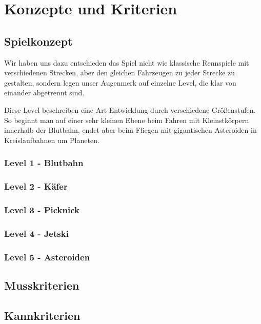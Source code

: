\section{Konzepte und Kriterien}

\subsection{Spielkonzept}

Wir haben uns dazu entschieden das Spiel nicht wie klassische Rennspiele mit verschiedenen Strecken, aber den gleichen Fahrzeugen zu jeder Strecke zu gestalten, sondern legen unser Augenmerk auf einzelne Level, die klar von einander abgetrennt sind.

Diese Level beschreiben eine Art Entwicklung durch verschiedene Größenstufen.
So beginnt man auf einer sehr kleinen Ebene beim Fahren mit Kleinstkörpern innerhalb der Blutbahn, endet aber beim Fliegen mit gigantischen Asteroiden in Kreislaufbahnen um Planeten.

\subsubsection{Level 1 - Blutbahn}

\subsubsection{Level 2 - Käfer}

\subsubsection{Level 3 - Picknick}

\subsubsection{Level 4 - Jetski}

\subsubsection{Level 5 - Asteroiden}

\subsection{Musskriterien}

\subsection{Kannkriterien}
